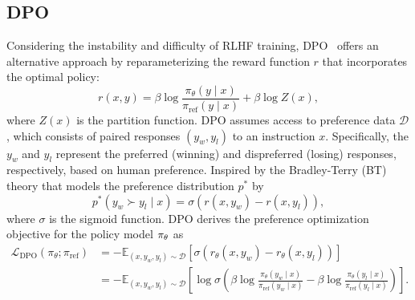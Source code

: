 \subsection{DPO}
\label{subsec:dpo}
Considering the instability and difficulty of RLHF training, DPO~\citep{Rafailov2023DirectPO} offers an alternative approach by reparameterizing the reward function $r$ that incorporates the optimal policy:  
\begin{equation}
\label{eq:dpo_reward}
r(x,y) = \beta \log \frac{\pi_\theta(y \mid x)}{\pi_{\text{ref}}(y \mid x)} + \beta \log Z(x),
\end{equation}
where $Z(x)$ is the partition function. DPO assumes access to preference data $\mathcal{D}$, which consists of paired responses $\left(y_w, y_l\right)$ to an instruction $x$. Specifically, the $y_w$ and $y_l$ represent the preferred (winning) and dispreferred (losing) responses, respectively, based on human preference. Inspired by the Bradley-Terry (BT) theory that models the preference distribution $p^*$ by
\begin{equation}
\label{eq:bt_model}
    p^*(y_w\succ y_l \mid x)= \sigma(r(x, y_w)- r(x, y_l)),
\end{equation}
where $\sigma$ is the sigmoid function.
DPO derives the preference optimization objective for the policy model $\pi_\theta$ as
\begin{equation}
    \label{eq:dpo}
    \begin{aligned}
        \mathcal{L}_{\text{DPO}}(\pi_\theta; \pi_{\text{ref}}) &= - \mathbb{E}_{(x, y_w, y_l) \sim \mathcal{D}}\left[\sigma(r_\theta(x, y_w)- r_\theta(x, y_l))\right]\\
        &= - \mathbb{E}_{(x, y_w, y_l) \sim \mathcal{D}}\left[ \log \sigma \left( \beta \log \frac{\pi_\theta(y_w \mid x)}{\pi_{\text{ref}}(y_w \mid x)} - \beta \log \frac{\pi_\theta(y_l \mid x)}{\pi_{\text{ref}}(y_l \mid x)}\right) \right].
    \end{aligned}
\end{equation}


